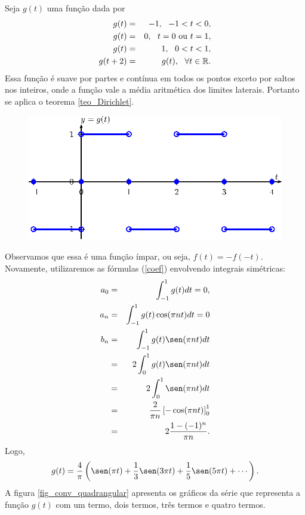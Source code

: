 \begin{ex}\label{ex_quadrada} Seja $g(t)$ uma função dada por
\begin{eqnarray*}
g(t)&=&-1, \ \ -1< t<0,\\
g(t)&=&0, \ \ t=0\ \hbox{ou}\ t=1,\\
g(t)&=&1, \ \ 0< t<1,\\
g(t+2)&=&g(t),\ \ \forall t\in\mathbb{R}.
\end{eqnarray*}
Essa função é suave por partes e contínua em todos os pontos exceto por saltos nos inteiros, onde a função vale a média aritmética dos limites laterais. Portanto se aplica o teorema \ref{teo_Dirichlet}.
\begin{figure}[!ht]
\begin{center}
\includegraphics{cap_series/pics/figura_3}\end{center}
\end{figure}
Observamos que essa é uma função ímpar, ou seja, $f(t)=-f(-t)$. Novamente, utilizaremos as fórmulas (\ref{coef}) envolvendo integrais simétricas:
  \begin{eqnarray*}
   a_0 &=& \int_{-1}^{1} g(t) dt=0,\\
	a_n &=&  \int_{-1}^{1} g(t)\cos(\pi n t)dt=0\\
   b_n &=& \int_{-1}^{1} g(t)\sen(\pi n t)dt\\
       &=& 2\int_{0}^{1} g(t)\sen(\pi n t)dt\\
       &=&2\int_{0}^{1} \sen(\pi n t)dt\\
	&=&\frac{2}{\pi n}\left[-\cos(\pi n t)\right]_0^1\\
   &=& 2\frac{1-(-1)^n}{\pi n}.
  \end{eqnarray*}
Logo,
\begin{equation}
g(t)=\frac{4}{\pi}\left(\sen(\pi t)+\frac{1}{3}\sen(3\pi t)+\frac{1}{5}\sen(5\pi t)+\cdots\right).
\end{equation}
A figura \ref{fig_conv_quadrangular} apresenta os gráficos da série que representa a função $g(t)$ com um termo, dois termos, três termos e quatro termos.

\end{ex}

